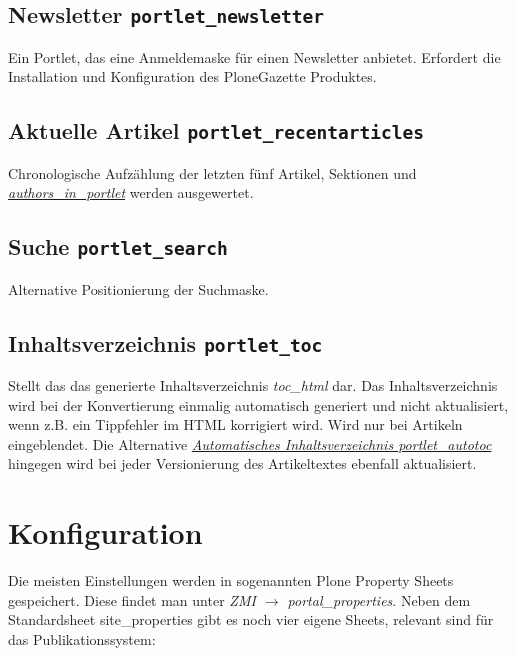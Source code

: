 \documentclass[a4paper,10pt,ngerman]{sphinxmanual}
\begin{document}
\section{Newsletter \texttt{portlet\_newsletter}}
\label{portlets:portlet-newsletter}\label{portlets:newsletter-portlet-newsletter}
Ein Portlet, das eine Anmeldemaske für einen Newsletter anbietet. Erfordert die
Installation und Konfiguration des PloneGazette Produktes.


\section{Aktuelle Artikel \texttt{portlet\_recentarticles}}
\label{portlets:aktuelle-artikel-portlet-recentarticles}\label{portlets:portlet-recentarticles}
Chronologische Aufzählung der letzten fünf Artikel, Sektionen und
{\hyperref[dipp_properties:prop-authors-in-portlet]{\emph{authors\_in\_portlet}}} werden ausgewertet.


\section{Suche \texttt{portlet\_search}}
\label{portlets:suche-portlet-search}\label{portlets:portlet-search}
Alternative Positionierung der Suchmaske.


\section{Inhaltsverzeichnis \texttt{portlet\_toc}}
\label{portlets:inhaltsverzeichnis-portlet-toc}\label{portlets:portlet-toc}
Stellt das das generierte Inhaltsverzeichnis \emph{toc\_html} dar.
Das Inhaltsverzeichnis wird bei der Konvertierung einmalig automatisch generiert
und nicht aktualisiert, wenn z.B. ein Tippfehler im HTML korrigiert wird.
Wird nur bei Artikeln eingeblendet. Die Alternative {\hyperref[portlets:portlet-autotoc]{\emph{Automatisches Inhaltsverzeichnis portlet\_autotoc}}} hingegen wird bei
jeder Versionierung des Artikeltextes ebenfall aktualisiert.


\chapter{Konfiguration}
\label{konfiguration:konfiguration}\label{konfiguration::doc}
Die meisten Einstellungen werden in sogenannten Plone Property Sheets gespeichert.
Diese findet man unter \emph{ZMI \(\rightarrow\) portal\_properties}.
Neben dem Standardsheet site\_properties gibt es noch vier eigene Sheets, relevant sind
für das Publikationssystem:
\end{document}
